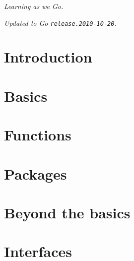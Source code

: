 \documentclass[a4paper,twoside,openleft]{blocksbook}
\begin{document}
\newpage

\thispagestyle{empty}
\begin{figure}[H]
\begin{center}
\end{center}
\end{figure}
\begin{center}
\vfill
\emph{Learning as we Go.}

\emph{\tiny{Updated to Go \texttt{release.2010-10-20}.}}
\vspace{.2\stockheight}
\end{center}

\clearpage

\tableofcontents*
\listoffigures*
\listoftables*
\listofcode* 
\listofex* 
\clearpage


\chapter{Introduction}
\label{chap:intro}


\chapter{Basics}
\label{chap:basics}


\chapter{Functions}
\label{chap:functions}


\chapter{Packages}
\label{chap:packages}


\chapter{Beyond the basics}
\label{chap:beyond}


\chapter{Interfaces}
\label{chap:interfaces}

\end{document}
